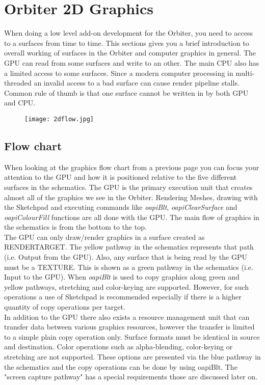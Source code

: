 \documentclass[Orbiter Developer Manual.tex]{subfiles}
\begin{document}
\section{Orbiter 2D Graphics}
When doing a low level add-on development for the Orbiter, you need to access to a surfaces from time to time. This sections gives you a brief introduction to overall working of surfaces in the Orbiter and computer graphics in general. The GPU can read from some surfaces and write to an other. The main CPU also has a limited access to some surfaces. Since a modern computer processing in multi-threaded an invalid access to a bad surface can cause render pipeline stalls. Common rule of thumb is that one surface cannot be written in by both GPU and CPU.\\

\begin{figure}[H]
  \centering
  \texttt{[image: 2dflow.jpg]}
\end{figure}

\subsection{Flow chart}
When looking at the graphics flow chart from a previous page you can focus your attention to the GPU and how it is positioned relative to the five different surfaces in the schematics. The GPU is the primary execution unit that creates almost all of the graphics we see in the Orbiter. Rendering Meshes, drawing with the Sketchpad and executing commands like \textit{oapiBlt}, \textit{oapiClearSurface} and \textit{oapiColourFill} functions are all done with the GPU. The main flow of graphics in the schematics is from the bottom to the top.\\

The GPU can only draw/render graphics in a surface created as \textsc{RENDERTARGET}. The yellow pathway in the schematics represents that path (i.e. Output from the GPU). Also, any surface that is being read by the GPU must be a \textsc{TEXTURE}. This is shown as a green pathway in the schematics (i.e. Input to the GPU). When \textit{oapiBlt} is used to copy graphics along green and yellow pathways, stretching and color-keying are supported. However, for such operations a use of Sketchpad is recommended especially if there is a higher quantity of copy operations per target.\\

In addition to the GPU there also exists a resource management unit that can transfer data between various graphics resources, however the transfer is limited to a simple plain copy operation only. Surface formats must be identical in source and destination. Color operations such as alpha-blending, color-keying or stretching are not supported. These options are presented via the blue pathway in the schematics and the copy operations can be done by using oapiBlt. The "screen capture pathway" has a special requirements those are discussed later on.\\
\end{document}

